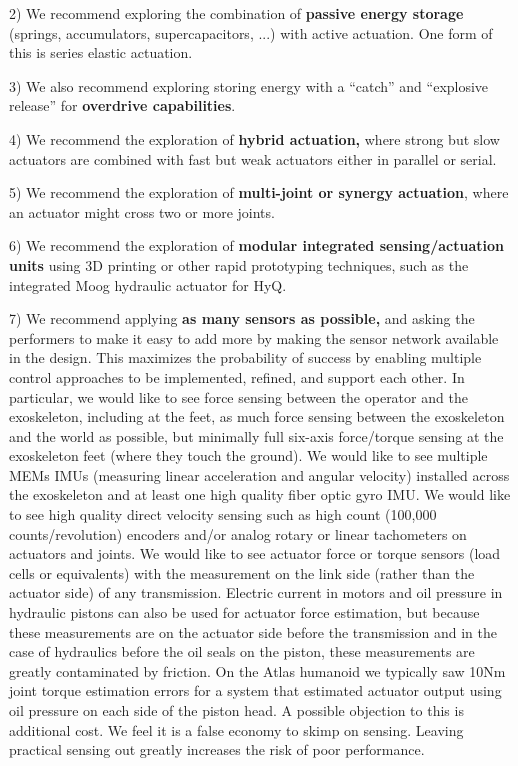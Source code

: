 \documentclass[letterpaper,12pt,fullpage]{article}
\begin{document}
2) We recommend exploring the combination of {\bf passive energy storage} (springs,
accumulators, supercapacitors, ...) with active actuation. One form of this
is series elastic actuation. 

3) We also recommend exploring storing energy with
a ``catch'' and ``explosive release'' for {\bf overdrive capabilities}. 

4) We recommend the exploration of {\bf hybrid actuation,} where strong but slow actuators
are combined with fast but weak actuators either in parallel or serial.

5) We recommend the exploration of {\bf multi-joint or synergy actuation}, where an actuator
might cross two or more joints.

6) We recommend the exploration of {\bf modular integrated sensing/actuation units} using 3D printing
or other rapid prototyping techniques, such as the integrated Moog hydraulic
actuator for HyQ.

7) We recommend applying {\bf as many sensors as possible,} and asking the performers
to make it easy to add more by making the sensor network available in the design.
This maximizes the probability of success
by enabling multiple control
approaches to be implemented, refined, and support each other.
In particular, we would like to see force sensing between the operator and the
exoskeleton, including at the feet, as much force sensing between the exoskeleton 
and the world as possible, but minimally full six-axis force/torque sensing at
the exoskeleton feet (where they touch the ground). We would like to see multiple MEMs
IMUs (measuring linear acceleration and angular velocity) installed across 
the exoskeleton and at least one high quality fiber optic gyro IMU.
We would like to see high quality direct velocity sensing
such as high count (100,000 counts/revolution) encoders and/or 
analog rotary or linear tachometers on actuators and joints. 
We would like to see actuator force or torque sensors
(load cells or equivalents) with the measurement on the link side (rather than
the actuator side) of any transmission. Electric current in motors and oil
pressure in hydraulic pistons can also be used for actuator force estimation,
but because these measurements are on the actuator side before the transmission
and in the case of hydraulics before the oil seals on the piston, these measurements
are greatly contaminated by friction. On the Atlas humanoid we typically saw 10Nm
joint torque estimation errors for a system that estimated actuator output using
oil pressure on each side of the piston head.
A possible objection to this is additional cost. We feel it is a false
economy to skimp on sensing. Leaving practical sensing out greatly increases
the risk of poor performance.

%
%
\end{document}
